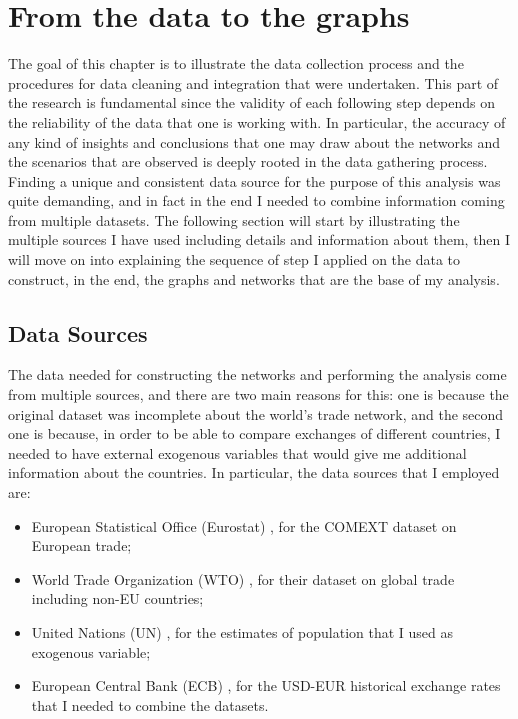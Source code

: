 
\chapter{From the data to the graphs}

The goal of this chapter is to illustrate the data collection process and the procedures for data cleaning and integration that were undertaken. This part of the research is fundamental since the validity of each following step depends on the reliability of the data that one is working with. In particular, the accuracy of any kind of insights and conclusions that one may draw about the networks and the scenarios that are observed is deeply rooted in the data gathering process.
Finding a unique and consistent data source for the purpose of this analysis was quite demanding, and in fact in the end I needed to combine information coming from multiple datasets. The following section will start by illustrating the multiple sources I have used including details and information about them, then I will move on into explaining the sequence of step I applied on the data to construct, in the end, the graphs and networks that are the base of my analysis.

\section{Data Sources}

The data needed for constructing the networks and performing the analysis come from multiple sources, and there are two main reasons for this: one is because the original dataset was incomplete about the world's trade network, and the second one is because, in order to be able to compare exchanges of different countries, I needed to have external exogenous variables that would give me additional information about the countries. In particular, the data sources that I employed are:
\begin{itemize}
    \item European Statistical Office (Eurostat) \cite{eurostat2022comext}, for the COMEXT dataset on European trade;
    \item World Trade Organization (WTO) \cite{wto2022stats}, for their dataset on global trade including non-EU countries;
    \item United Nations (UN) \cite{un2022population}, for the estimates of population that I used as exogenous variable;
    \item European Central Bank (ECB) \cite{ecb2021usdeur}, for the USD-EUR historical exchange rates that I needed to combine the datasets.
\end{itemize}

